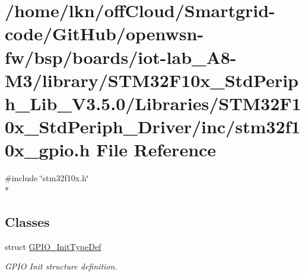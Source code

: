 \hypertarget{iot-lab___a8-_m3_2library_2_s_t_m32_f10x___std_periph___lib___v3_85_80_2_libraries_2_s_t_m32_f1061c1f57d51e9942774eb521c3c5fb6b9}{}\section{/home/lkn/off\+Cloud/\+Smartgrid-\/code/\+Git\+Hub/openwsn-\/fw/bsp/boards/iot-\/lab\+\_\+\+A8-\/\+M3/library/\+S\+T\+M32\+F10x\+\_\+\+Std\+Periph\+\_\+\+Lib\+\_\+\+V3.5.0/\+Libraries/\+S\+T\+M32\+F10x\+\_\+\+Std\+Periph\+\_\+\+Driver/inc/stm32f10x\+\_\+gpio.h File Reference}
\label{iot-lab___a8-_m3_2library_2_s_t_m32_f10x___std_periph___lib___v3_85_80_2_libraries_2_s_t_m32_f1061c1f57d51e9942774eb521c3c5fb6b9}
{\ttfamily \#include \char`\"{}stm32f10x.\+h\char`\"{}}\\*
\subsection*{Classes}
\begin{DoxyCompactItemize}
\item 
struct \hyperlink{struct_g_p_i_o___init_type_def}{G\+P\+I\+O\+\_\+\+Init\+Type\+Def}
\begin{DoxyCompactList}\small\item\em G\+P\+IO Init structure definition. \end{DoxyCompactList}\end{DoxyCompactItemize}

